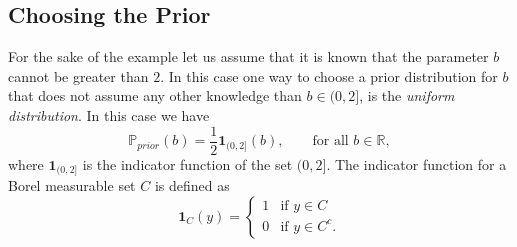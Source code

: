 \documentclass[12pt]{book}
\newcommand{\prior}{\mathbb{P}_{prior}}
\begin{document}
\subsection{Choosing the Prior}

For the sake of
the example let us assume that  it is known that
the parameter $b$ cannot be greater than $2$. In this case one way to choose a prior distribution
for $b$ that does not assume any other knowledge than $b\in (0,2]$, is the \textit{uniform distribution}. 
In this case we have 
\begin{equation}\label{eqnpriortoyproblem}
\prior(b)=\frac{1}{2}\textbf{1}_{(0,2]}(b),\qquad\text{for all $b\in\mathbb{R}$},
\end{equation}
where $\textbf{1}_{(0,2]}$ is the indicator function of the set $(0,2]$. The indicator function for a Borel measurable set $C$ is
defined as
\begin{equation*}
\textbf{1}_{C}(y)=\left\{
	\begin{array}{ll}
		1 & \mbox{if }	y\in C\\
		0 & \mbox{if }   y\in C^{c}.
	\end{array}
\right.
\end{equation*}
\end{document}
